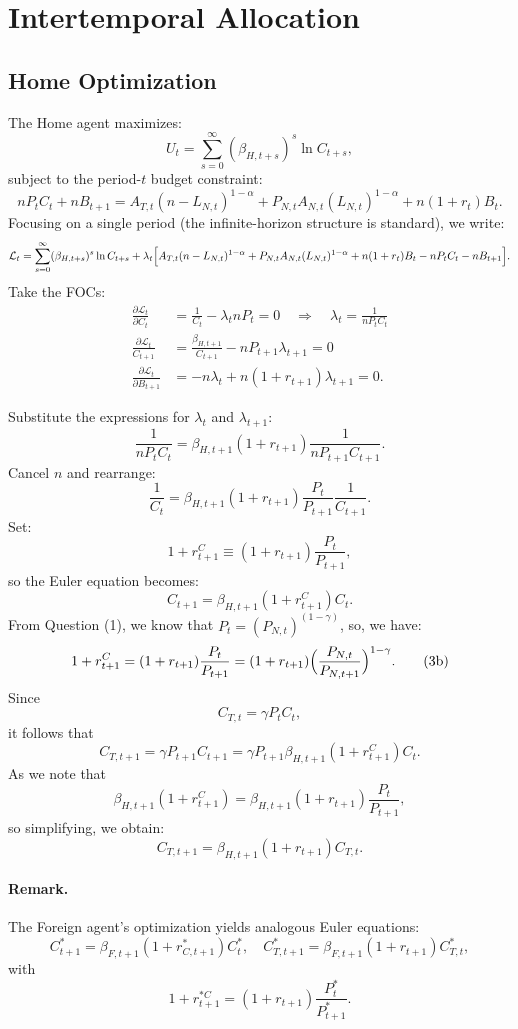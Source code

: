 \documentclass[a4paper,12pt]{article} %
\theoremstyle{nonitalic}
\begin{document}
\section{Intertemporal Allocation}

\subsection*{Home Optimization}
The Home agent maximizes:
\[
U_t = \sum_{s=0}^{\infty} (\beta_{H,t+s})^s \ln C_{t+s},
\]
subject to the period-$ t $ budget constraint:
\[
n P_t C_t + n B_{t+1} = A_{T,t} (n-L_{N,t})^{ 1-\alpha} + P_{N,t} A_{N,t} (L_{N,t})^{ 1-\alpha} + n(1+r_t)B_t.
\]
Focusing on a single period (the infinite-horizon structure is standard), we write:
\[
\mathcal{L}_t = \sum_{s=0}^{\infty} (\beta_{H,t+s})^s \ln C_{t+s} + \lambda_t \Bigl[A_{T,t}(n-L_{N,t})^{1-\alpha} + P_{N,t}A_{N,t}(L_{N,t})^{1-\alpha} + n(1+r_t)B_t - n P_t C_t - n B_{t+1}\Bigr].
\]
Take the FOCs:
\begin{align*}
    \frac{\partial \mathcal{L}_t}{\partial C_t} &= \frac{1}{C_t} - \lambda_t nP_t = 0 \quad \Rightarrow \quad \lambda_t = \frac{1}{nP_t C_t} \\
    \frac{\partial \mathcal{L}_t}{C_{t+1}} &= \frac{\beta_{H,t+1}}{C_{t+1}} - n P_{t+1} \lambda_{t+1} = 0 \\
    \frac{\partial \mathcal{L}_t}{\partial B_{t+1}} &= -n \lambda_t + n (1+r_{t+1}) \lambda_{t+1} = 0.
\end{align*}

Substitute the expressions for \(\lambda_t\) and \(\lambda_{t+1}\):
\[
\frac{1}{nP_t C_t} = \beta_{H,t+1}(1+r_{t+1})\frac{1}{nP_{t+1} C_{t+1}}.
\]
Cancel \(n\) and rearrange:
\[
\frac{1}{C_t} = \beta_{H,t+1}(1+r_{t+1})\frac{P_t}{P_{t+1}}\frac{1}{C_{t+1}}.
\]
Set:
\[
1 + r_{t+1}^C \equiv (1+r_{t+1})\frac{P_t}{P_{t+1}},
\]
so the Euler equation becomes:
\[
C_{t+1} = \beta_{H,t+1}(1+r_{t+1}^C)  C_t. \tag{3a}
\]
From Question (1), we know that $P_t = (P_{N,t})^{(1-\gamma)}$,
so, we have:
\[
1 + r_{t+1}^C = (1+r_{t+1})\frac{P_t}{P_{t+1}} = (1+r_{t+1})\Bigl(\frac{P_{N,t}}{P_{N,t+1}}\Bigr)^{1-\gamma}. \tag{3b}
\]
Since
\[
C_{T,t} = \gamma P_t C_t,
\]
it follows that
\[
C_{T,t+1} = \gamma P_{t+1} C_{t+1} = \gamma P_{t+1} \beta_{H,t+1}(1+r_{t+1}^C) C_t.
\]
As we note that
\[
\beta_{H,t+1}(1+r_{t+1}^C) = \beta_{H,t+1}(1+r_{t+1})\frac{P_t}{P_{t+1}},
\]
so simplifying, we obtain:
\[
C_{T,t+1} = \beta_{H,t+1}(1+r_{t+1})  C_{T,t}. \tag{3c}
\]

\paragraph{Remark.}  
The Foreign agent's optimization yields analogous Euler equations:
\[
C_{t+1}^* = \beta_{F,t+1}(1+r_{C,t+1}^*)  C_t^*,\quad
C_{T,t+1}^* = \beta_{F,t+1}(1+r_{t+1}) C_{T,t}^*,
\]
with
\[
1+r_{t+1}^{*C} = (1+r_{t+1})\frac{P_t^*}{P_{t+1}^*}.
\]
\end{document}
